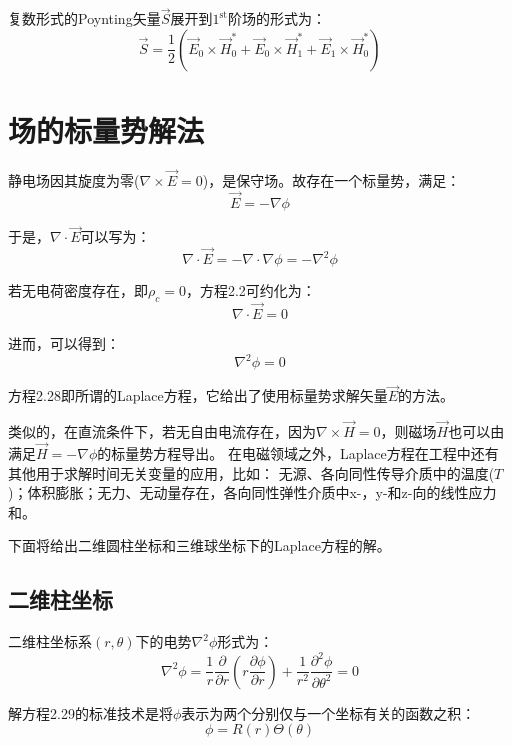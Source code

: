 复数形式的Poynting矢量$\vec{S}$展开到$\mathrm{1^{st}}$阶场的形式为：
\begin{equation}\label{eqn:1st poynting}
\vec{S}=\frac{1}{2}\left(\vec{E}_0\times \vec{H}_0^*+\vec{E}_0\times \vec{H}_1^*+\vec{E}_1\times \vec{H}_0^*\right)
\end{equation}

\section{场的标量势解法}
静电场因其旋度为零($\nabla \times \vec{E}=0$)，是保守场。故存在一个标量势，满足：
\begin{equation}
  \vec{E}=-\nabla \phi
\end{equation}

于是，$\nabla\cdot\vec{E}$可以写为：
\begin{equation}
  \nabla\cdot\vec{E}=-\nabla\cdot\nabla\phi=-\nabla^2\phi
\end{equation}

若无电荷密度存在，即$\rho_c=0$，方程2.2可约化为：
\begin{equation}
  \nabla\cdot\vec{E}=0
\end{equation}

进而，可以得到：
\begin{equation}
\nabla^2\phi=0
\end{equation}

方程2.28即所谓的Laplace方程，它给出了使用标量势求解矢量$\vec{E}$的方法。

类似的，在直流条件下，若无自由电流存在，因为$\nabla\times \vec{H}=0$，则磁场$\vec{H}$也可以由满足$\vec{H}=-\nabla \phi$的标量势方程导出。
在电磁领域之外，Laplace方程在工程中还有其他用于求解时间无关变量的应用，比如：
无源、各向同性传导介质中的温度($T$)；体积膨胀；无力、无动量存在，各向同性弹性介质中x-，y-和z-向的线性应力和。

下面将给出二维圆柱坐标和三维球坐标下的Laplace方程的解。
\subsection{二维柱坐标}
二维柱坐标系$(r,\theta)$下的电势$\nabla^2\phi$形式为：
\begin{equation}
  \nabla^2\phi = \frac{1}{r}\frac{\partial}{\partial r}\left(r\frac{\partial \phi}{\partial r}\right)+\frac{1}{r^2}\frac{\partial^2\phi}{\partial\theta^2}=0
\end{equation}

解方程2.29的标准技术是将$\phi$表示为两个分别仅与一个坐标有关的函数之积：
\begin{equation}
  \phi=R(r)\Theta(\theta)
\end{equation}

